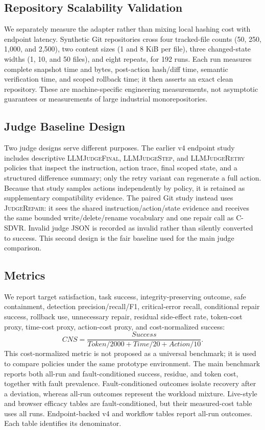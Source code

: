 \documentclass[pdflatex,sn-apa]{sn-jnl}
\begin{document}
\subsection{Repository Scalability Validation}

We separately measure the adapter rather than mixing local hashing cost with endpoint latency. Synthetic Git repositories cross four tracked-file counts (50, 250, 1,000, and 2,500), two content sizes (1 and 8 KiB per file), three changed-state widths (1, 10, and 50 files), and eight repeats, for 192 runs. Each run measures complete snapshot time and bytes, post-action hash/diff time, semantic verification time, and scoped rollback time; it then asserts an exact clean repository. These are machine-specific engineering measurements, not asymptotic guarantees or measurements of large industrial monorepositories.

\subsection{Judge Baseline Design}

Two judge designs serve different purposes. The earlier v4 endpoint study includes descriptive \textsc{LLMJudgeFinal}, \textsc{LLMJudgeStep}, and \textsc{LLMJudgeRetry} policies that inspect the instruction, action trace, final scoped state, and a structured difference summary; only the retry variant can regenerate a full action. Because that study samples actions independently by policy, it is retained as supplementary compatibility evidence. The paired Git study instead uses \textsc{JudgeRepair}: it sees the shared instruction/action/state evidence and receives the same bounded write/delete/rename vocabulary and one repair call as C-SDVR. Invalid judge JSON is recorded as invalid rather than silently converted to success. This second design is the fair baseline used for the main judge comparison.

\subsection{Metrics}

We report target satisfaction, task success, integrity-preserving outcome, safe containment, detection precision/recall/F1, critical-error recall, conditional repair success, rollback use, unnecessary repair, residual side-effect rate, token-cost proxy, time-cost proxy, action-cost proxy, and cost-normalized success:
\begin{equation}
  CNS = \frac{Success}{Token/2000 + Time/20 + Action/10}.
\end{equation}
This cost-normalized metric is not proposed as a universal benchmark; it is used to compare policies under the same prototype environment. The main benchmark reports both all-run and fault-conditioned success, residue, and token cost, together with fault prevalence. Fault-conditioned outcomes isolate recovery after a deviation, whereas all-run outcomes represent the workload mixture. Live-style and browser efficacy tables are fault-conditioned, but their measured-cost table uses all runs. Endpoint-backed v4 and workflow tables report all-run outcomes. Each table identifies its denominator.
\end{document}
